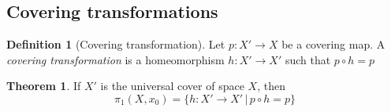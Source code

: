 \documentclass[a4paper,14pt]{extarticle}
\theoremstyle{definition}
\newtheorem*{theorem}{Theorem}
\newtheorem*{definition}{Definition}
\begin{document}
\subsection{Covering transformations}

\begin{definition}[Covering transformation]
  Let $p:X'\rightarrow X$ be a covering map. A \emph{covering transformation} is a homeomorphism $h:X'\rightarrow X'$ such that $p\circ h=p$
\end{definition}

\begin{theorem}
  If $X'$ is the universal cover of space $X$, then 
  \[\pi_1(X,x_0)=\{h:X'\rightarrow X'\,|\,p\circ h =p\}\]
\end{theorem}
\end{document}
